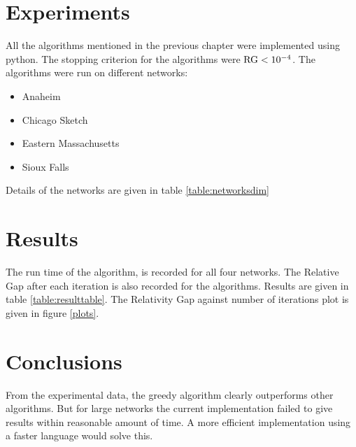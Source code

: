 \section{Experiments}
All the algorithms mentioned in the previous chapter were implemented
using python. The stopping criterion for the algorithms were
$\hbox{RG}<10^{-4}$. The algorithms were run on different networks:

\begin{itemize}
	\item Anaheim
	\item Chicago Sketch
	\item Eastern Massachusetts
	\item Sioux Falls
\end{itemize}

Details of the networks are given in table \ref{table:networksdim}



\section{Results}
The run time of the algorithm, is recorded for all four networks.
The Relative Gap after each iteration is also recorded for the algorithms.
Results are given in table \ref{table:resulttable}. The Relativity Gap
against number of iterations plot is given in figure \ref{plots}.





\section{Conclusions}
From the experimental data, the greedy algorithm clearly outperforms
other algorithms.
But for large networks the current implementation
failed to give results within reasonable amount of time.
A more efficient implementation using a faster language would
solve this.
